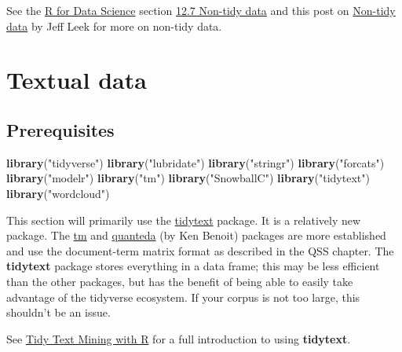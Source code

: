 \documentclass[]{book}
\newenvironment{Shaded}{\begin{snugshade}}{\end{snugshade}}
\newcommand{\KeywordTok}[1]{\textcolor[rgb]{0.13,0.29,0.53}{\textbf{#1}}}
\newcommand{\NormalTok}[1]{#1}
\newcommand{\StringTok}[1]{\textcolor[rgb]{0.31,0.60,0.02}{#1}}
\theoremstyle{definition}
\theoremstyle{definition}
\theoremstyle{definition}
\theoremstyle{remark}
\begin{document}
See the \href{http://r4ds.had.co.nz/}{R for Data Science} section
\href{http://r4ds.had.co.nz/tidy-data.html\#non-tidy-data}{12.7 Non-tidy
data} and this post on
\href{http://simplystatistics.org/2016/02/17/non-tidy-data/}{Non-tidy
data} by Jeff Leek for more on non-tidy data.

\hypertarget{textual-data}{%
\section{Textual data}\label{textual-data}}

\hypertarget{prerequisites-4}{%
\subsection*{Prerequisites}\label{prerequisites-4}}

\begin{Shaded}
\begin{Highlighting}[]
\KeywordTok{library}\NormalTok{(}\StringTok{"tidyverse"}\NormalTok{)}
\KeywordTok{library}\NormalTok{(}\StringTok{"lubridate"}\NormalTok{)}
\KeywordTok{library}\NormalTok{(}\StringTok{"stringr"}\NormalTok{)}
\KeywordTok{library}\NormalTok{(}\StringTok{"forcats"}\NormalTok{)}
\KeywordTok{library}\NormalTok{(}\StringTok{"modelr"}\NormalTok{)}
\KeywordTok{library}\NormalTok{(}\StringTok{"tm"}\NormalTok{)}
\KeywordTok{library}\NormalTok{(}\StringTok{"SnowballC"}\NormalTok{)}
\KeywordTok{library}\NormalTok{(}\StringTok{"tidytext"}\NormalTok{)}
\KeywordTok{library}\NormalTok{(}\StringTok{"wordcloud"}\NormalTok{)}
\end{Highlighting}
\end{Shaded}

This section will primarily use the
\href{https://cran.r-project.org/package=tidytext}{tidytext} package. It
is a relatively new package. The
\href{https://cran.r-project.org/package=tm}{tm} and
\href{https://cran.r-project.org/package=quanteda}{quanteda} (by Ken
Benoit) packages are more established and use the document-term matrix
format as described in the QSS chapter. The \textbf{tidytext} package
stores everything in a data frame; this may be less efficient than the
other packages, but has the benefit of being able to easily take
advantage of the tidyverse ecosystem. If your corpus is not too large,
this shouldn't be an issue.

See \href{http://tidytextmining.com/}{Tidy Text Mining with R} for a
full introduction to using \textbf{tidytext}.
\end{document}

